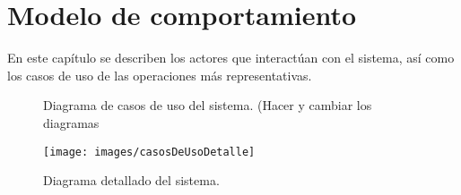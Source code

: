 \chapter{Modelo de comportamiento}	
\label{cap:modDinamico}

	En este capítulo se describen los actores que interactúan con el sistema, así como los casos de uso de las operaciones más representativas.
	
\begin{figure}[htbp]
	\begin{center}
		\caption{Diagrama de casos de uso del sistema. (Hacer y cambiar los diagramas}
		\label{fig:casosDeUso}
	\end{center}
\end{figure}

\begin{figure}[htbp]
	\begin{center}
		\texttt{[image: images/casosDeUsoDetalle]}
		\caption{Diagrama detallado del sistema.}
		\label{fig:casosDeUsoDetalle}
	\end{center}
\end{figure}


